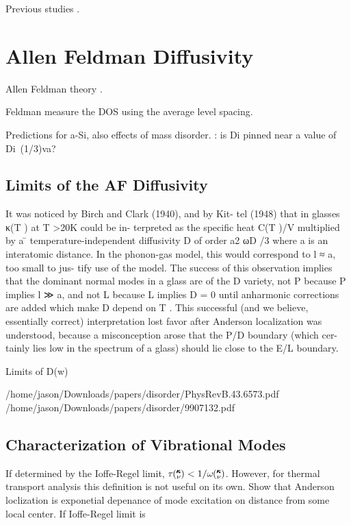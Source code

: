 \documentclass[aps,prb,preprint,superscriptaddress,amsmath,amssymb,floatfix]{revtex4}
\newcommand{\kv}{\mspace{-4.0mu}\left(\mspace{-8.0mu}
\begin{smallmatrix}&\pmb{\kappa} \\&\nu\end{smallmatrix}
\mspace{-3.0mu}\right)}
\begin{document}
Previous studies \cite{he_heat_2011}.

\section{\label{S-Motivation}Allen Feldman Diffusivity}

Allen Feldman theory \cite{allen_thermal_1993}.

Feldman measure the DOS using the average level spacing.
\cite{feldman_numerical_1999} 

Predictions for a-Si, also effects of mass disorder.
\cite{feldman_thermal_1993}: is Di pinned near a value of Di~(1/3)va?

\subsection{\label{S-Motivation-Amorphous}Limits of the AF Diffusivity}
It was noticed by Birch and Clark (1940), and by Kit-
tel (1948) that in glasses κ(T ) at T >20K could be in-
terpreted as the specific heat C(T )/V multiplied by a
 ̄
temperature-independent diffusivity D of order a2 ωD /3
where a is an interatomic distance. In the phonon-gas
model, this would correspond to l ≈ a, too small to jus-
tify use of the model. The success of this observation
implies that the dominant normal modes in a glass are of
the D variety, not P because P implies l ≫ a, and not L
because L implies D = 0 until anharmonic corrections are
added which make D depend on T . This successful (and
we believe, essentially correct) interpretation lost favor
after Anderson localization was understood, because a
misconception arose that the P/D boundary (which cer-
tainly lies low in the spectrum of a glass) should lie close
to the E/L boundary.

Limits of D(w)

/home/jason/Downloads/papers/disorder/PhysRevB.43.6573.pdf
/home/jason/Downloads/papers/disorder/9907132.pdf


\subsection{\label{S:Lifetimes:}Characterization of Vibrational Modes}
If determined by the Ioffe-Regel limit, $\tau \kv < 1/\omega \kv$.
\cite{taraskin_determination_1999} However, for thermal transport 
analysis this definition is not useful on its own. Show that Anderson 
loclization is exponetial depenance of mode excitation on distance from 
some local center\cite{feldman_numerical_1999}. If Ioffe-Regel limit is 
\end{document}
